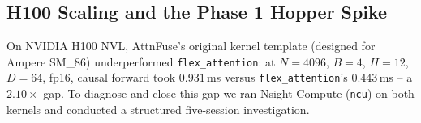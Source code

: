 %
%
%
%



\subsection{H100 Scaling and the Phase 1 Hopper Spike}
\label{sec:hopper}

On NVIDIA H100 NVL, AttnFuse's original kernel template (designed for
Ampere SM\_86) underperformed \texttt{flex\_attention}: at $N{=}4096$,
$B{=}4$, $H{=}12$, $D{=}64$, fp16, causal forward took $0.931$\,ms
versus \texttt{flex\_attention}'s $0.443$\,ms -- a $2.10\times$ gap. To
diagnose and close this gap we ran Nsight Compute (\texttt{ncu}) on
both kernels and conducted a structured five-session investigation.


